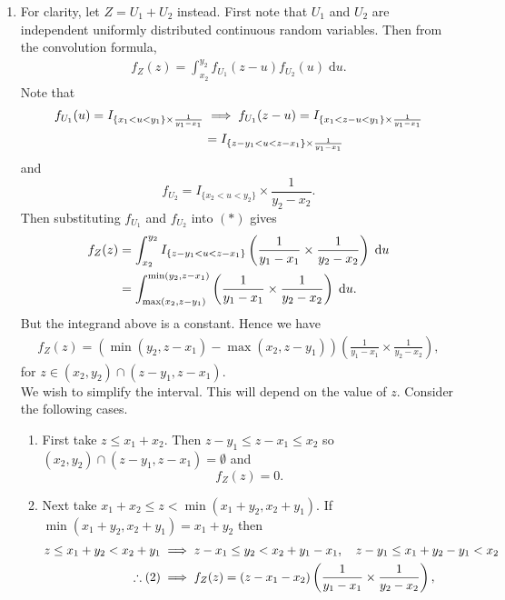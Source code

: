 \documentclass{article}
\begin{document}
\begin{enumerate}
  \item For clarity, let $Z = U_1 + U_2$ instead. First note that $U_1$ and $U_2$ are independent uniformly distributed continuous random variables. Then from the convolution formula, \begin{align} f_Z(z) = \int_{x_2}^{y_2} f_{U_1}(z - u)f_{U_2}(u) \; \mathrm{d} u. \tag{1} \end{align} Note that
  \begin{align}
      f_{U_1}(u) = I_{\{x_1 < u < y_1\} \times \frac{1}{y_1 - x_1}} &\implies f_{U_1}(z - u) = I_{\{x_1 < z - u < y_1\} \times \frac{1}{y_1 - x_1}} \notag \\
      &= I_{\{z - y_1 < u < z - x_1\} \times \frac{1}{y_1 - x_1}} \notag
  \end{align}
  and \[f_{U_2} = I_{\{x_2 < u < y_2\}} \times \frac{1}{y_2 - x_2}.\] 
  Then substituting $f_{U_1}$ and $f_{U_2}$ into $(\ast)$ gives
  \begin{align}
      f_Z(z) &= \int_{x_2}^{y_2} I_{\{z-y_1 < u < z-x_1\}} \left( \frac{1}{y_1 - x_1} \times \frac{1}{y_2 - x_2} \right) \; \mathrm{d}u \notag \\
      &= \int_{\max(x_2,z-y_1)}^{\min(y_2,z-x_1)} \left( \frac{1}{y_1 - x_1} \times \frac{1}{y_2 - x_2} \right) \; \mathrm{d}u. \notag
  \end{align}
  But the integrand above is a constant. Hence we have
  \begin{align}f_Z(z) = \left( \min(y_2, z-x_1) - \max(x_2,z-y_1) \right)\left( \frac{1}{y_1 - x_1} \times \frac{1}{y_2 - x_2} \right), \tag{2}\end{align}
  for $z \in (x_2, y_2) \cap (z-y_1, z-x_1)$.\\[1\baselineskip]We wish to simplify the interval. This will depend on the value of $z$. Consider the following cases.
  \begin{enumerate}
    \item First take $z \leq x_1 + x_2$. Then $z-y_1 \leq z - x_1 \leq x_2 $ so $(x_2, y_2) \cap (z-y_1, z-x_1) = \emptyset$ and \[f_Z(z) = 0.\]
    \item Next take $x_1 + x_2 \leq z < \min(x_1+y_2, x_2+y_1)$. If $\min(x_1+y_2, x_2+y_1) = x_1+y_2$ then
    \begin{align}
      z \leq x_1 + y_2 < x_2 + y_1 &\implies z - x_1 \leq y_2 < x_2 + y_1 - x_1, \quad z-y_1 \leq x_1 + y_2 - y_1 < x_2 \notag \\ 
      \therefore (2) &\implies f_Z(z) = (z-x_1-x_2)\left( \frac{1}{y_1 - x_1} \times \frac{1}{y_2 - x_2} \right), \notag

\end{align}
\end{enumerate}
\end{enumerate}
\end{document}
